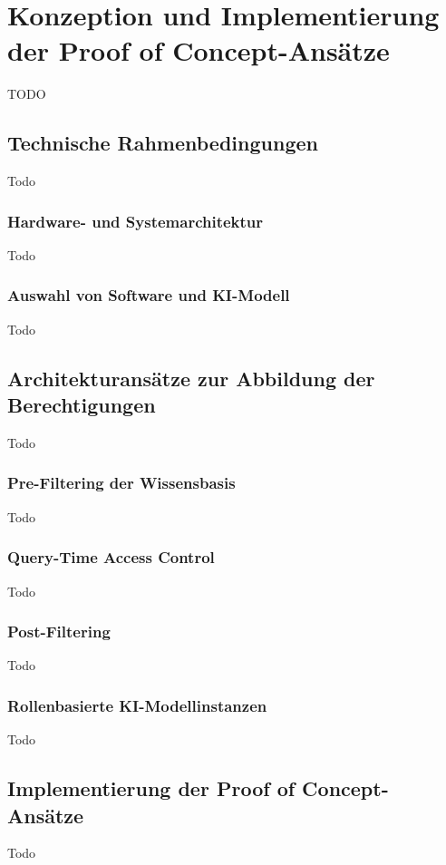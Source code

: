 \section{Konzeption und Implementierung der Proof of Concept-Ansätze}
TODO

\subsection{Technische Rahmenbedingungen}
Todo

\subsubsection{Hardware- und Systemarchitektur}
Todo

\subsubsection{Auswahl von Software und KI-Modell}
Todo

\subsection{Architekturansätze zur Abbildung der Berechtigungen}
Todo

\subsubsection{Pre-Filtering der Wissensbasis}
Todo

\subsubsection{Query-Time Access Control}
Todo

\subsubsection{Post-Filtering}
Todo

\subsubsection{Rollenbasierte KI-Modellinstanzen}
Todo

\subsection{Implementierung der Proof of Concept-Ansätze}
Todo
